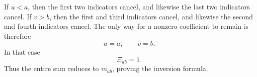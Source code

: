 \documentclass[11pt]{article}
\theoremstyle{definition}
\begin{document}
If \(u<a\), then the first two indicators cancel, and likewise the last two
indicators cancel. If \(v>b\), then the first and third indicators cancel, and
likewise the second and fourth indicators cancel. The only way for a nonzero
coefficient to remain is therefore
\[
u=a,\qquad v=b.
\]
In that case
\[
\Xi_{ab}=1.
\]
Thus the entire sum reduces to \(m_{ab}\), proving the inversion formula.

\end{document}
